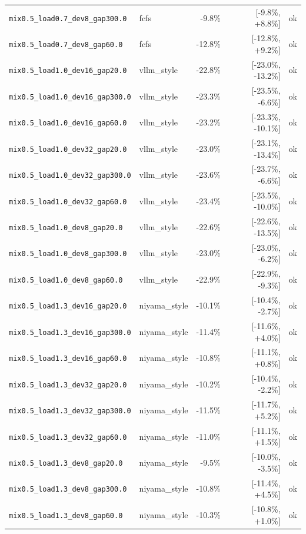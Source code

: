 \begin{longtable}{llrrl}
\texttt{mix0.5\_load0.7\_dev8\_gap300.0} & fcfs & -9.8\% & [-9.8\%, +8.8\%] & ok \\
\texttt{mix0.5\_load0.7\_dev8\_gap60.0} & fcfs & -12.8\% & [-12.8\%, +9.2\%] & ok \\
\texttt{mix0.5\_load1.0\_dev16\_gap20.0} & vllm\_style & -22.8\% & [-23.0\%, -13.2\%] & ok \\
\texttt{mix0.5\_load1.0\_dev16\_gap300.0} & vllm\_style & -23.3\% & [-23.5\%, -6.6\%] & ok \\
\texttt{mix0.5\_load1.0\_dev16\_gap60.0} & vllm\_style & -23.2\% & [-23.3\%, -10.1\%] & ok \\
\texttt{mix0.5\_load1.0\_dev32\_gap20.0} & vllm\_style & -23.0\% & [-23.1\%, -13.4\%] & ok \\
\texttt{mix0.5\_load1.0\_dev32\_gap300.0} & vllm\_style & -23.6\% & [-23.7\%, -6.6\%] & ok \\
\texttt{mix0.5\_load1.0\_dev32\_gap60.0} & vllm\_style & -23.4\% & [-23.5\%, -10.0\%] & ok \\
\texttt{mix0.5\_load1.0\_dev8\_gap20.0} & vllm\_style & -22.6\% & [-22.6\%, -13.5\%] & ok \\
\texttt{mix0.5\_load1.0\_dev8\_gap300.0} & vllm\_style & -23.0\% & [-23.0\%, -6.2\%] & ok \\
\texttt{mix0.5\_load1.0\_dev8\_gap60.0} & vllm\_style & -22.9\% & [-22.9\%, -9.3\%] & ok \\
\texttt{mix0.5\_load1.3\_dev16\_gap20.0} & niyama\_style & -10.1\% & [-10.4\%, -2.7\%] & ok \\
\texttt{mix0.5\_load1.3\_dev16\_gap300.0} & niyama\_style & -11.4\% & [-11.6\%, +4.0\%] & ok \\
\texttt{mix0.5\_load1.3\_dev16\_gap60.0} & niyama\_style & -10.8\% & [-11.1\%, +0.8\%] & ok \\
\texttt{mix0.5\_load1.3\_dev32\_gap20.0} & niyama\_style & -10.2\% & [-10.4\%, -2.2\%] & ok \\
\texttt{mix0.5\_load1.3\_dev32\_gap300.0} & niyama\_style & -11.5\% & [-11.7\%, +5.2\%] & ok \\
\texttt{mix0.5\_load1.3\_dev32\_gap60.0} & niyama\_style & -11.0\% & [-11.1\%, +1.5\%] & ok \\
\texttt{mix0.5\_load1.3\_dev8\_gap20.0} & niyama\_style & -9.5\% & [-10.0\%, -3.5\%] & ok \\
\texttt{mix0.5\_load1.3\_dev8\_gap300.0} & niyama\_style & -10.8\% & [-11.4\%, +4.5\%] & ok \\
\texttt{mix0.5\_load1.3\_dev8\_gap60.0} & niyama\_style & -10.3\% & [-10.8\%, +1.0\%] & ok \\

\end{longtable}
